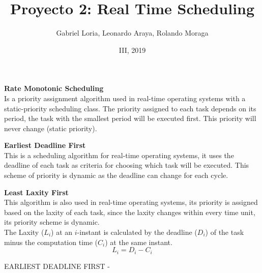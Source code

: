 \documentclass{beamer}
\author{Gabriel Loria, Leonardo Araya, Rolando Moraga}
\institute{ITCR, Maestría en Ingeniería en electr\'onica \\ Dise\~no de Sistemas en Tiempo Real}
\date{III, 2019}
\title{Proyecto 2: Real Time Scheduling}
\begin{document}
\begin{frame}
\titlepage
\end{frame}
\begin{frame}
\textbf{Rate Monotonic Scheduling} \\ Is a priority assignment algorithm used in real-time operating systems with a static-priority scheduling class. The priority assigned to each task depends on its period, the task with the smallest period will be executed first. This priority will never change (static priority).
\end{frame}

\begin{frame}
\textbf{Earliest Deadline First} \\ This is a scheduling algorithm for real-time operating systems, it uses the deadline of each task as criteria for choosing which task will be executed. This scheme of priority is dynamic as the deadline can change for each cycle.
\end{frame}

\begin{frame}
\textbf{Least Laxity First} \\ This algorithm is also used in real-time operating systems, its priority is assigned based on the laxity of each task, since the laxity changes within every time unit, its priority scheme is dynamic. \\ The Laxity ($L_i$) at an $i$-instant is calculated by the deadline ($D_i$) of the task minus the computation time ($C_i$) at the same instant. \[L_i = D_i - C_i\]
\end{frame}







\begin{frame}
EARLIEST DEADLINE FIRST -
\begin{table}[]
\end{table}
\end{frame}
\end{document}
